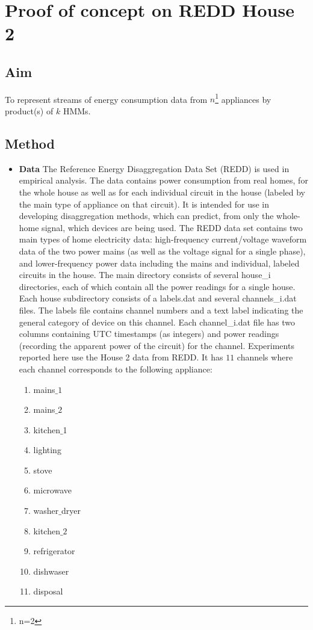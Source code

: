 \documentclass[letterpaper]{article}
\begin{document}
\section{Proof of concept on REDD House 2}
\subsection{Aim}
 To represent streams of energy consumption data from $n$\footnote{n=2} appliances by product(s) of $k$ HMMs.
 
\subsection{Method} 

\begin{itemize}
\item \textbf{Data } The Reference Energy Disaggregation Data Set (REDD) is used in empirical analysis. The data contains power consumption from real homes, for the whole house as well as for each individual circuit in
the house (labeled by the main type of appliance on that circuit). It is intended for use in developing disaggregation methods, which can predict, from only the whole-home signal, which devices are being used. The REDD data set contains two main types of home electricity data: high-frequency current/voltage waveform data of the two power mains (as well as the voltage signal for a single phase), and lower-frequency power data including the mains and individual, labeled circuits in the house. The main directory consists of several house\_i directories, each of which contain all the power readings for a single house.  Each house subdirectory consists of a labels.dat and several channels\_i.dat files. The labels file contains channel numbers and a text label indicating the general category of device on this channel. Each channel\_i.dat file has two columns containing UTC timestamps (as integers) and power readings (recording the apparent power of the circuit) for the channel.
Experiments reported here use the House 2 data from REDD. It has $11$ channels where each channel corresponds to the following appliance: 
\begin{enumerate}
\item mains$\_1$ 
\item mains$\_2$ 
\item kitchen$\_$1
\item lighting
\item stove 
\item microwave
\item washer$\_$dryer
\item kitchen$\_2$
\item refrigerator
\item dishwaser
\item disposal
\end{enumerate}


\end{itemize}
\end{document}
